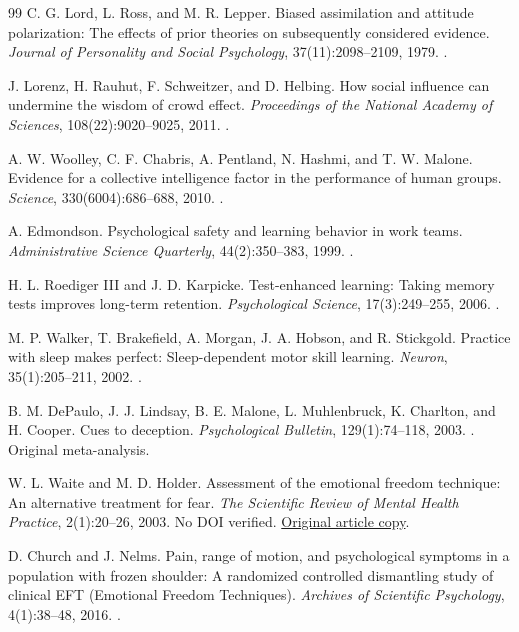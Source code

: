 \begin{thebibliography}{99}
 C. G. Lord, L. Ross, and M. R. Lepper. Biased assimilation and attitude polarization: The effects of prior theories on subsequently considered evidence. \emph{Journal of Personality and Social Psychology}, 37(11):2098--2109, 1979. .

 J. Lorenz, H. Rauhut, F. Schweitzer, and D. Helbing. How social influence can undermine the wisdom of crowd effect. \emph{Proceedings of the National Academy of Sciences}, 108(22):9020--9025, 2011. .

 A. W. Woolley, C. F. Chabris, A. Pentland, N. Hashmi, and T. W. Malone. Evidence for a collective intelligence factor in the performance of human groups. \emph{Science}, 330(6004):686--688, 2010. .

 A. Edmondson. Psychological safety and learning behavior in work teams. \emph{Administrative Science Quarterly}, 44(2):350--383, 1999. .

 H. L. Roediger III and J. D. Karpicke. Test-enhanced learning: Taking memory tests improves long-term retention. \emph{Psychological Science}, 17(3):249--255, 2006. .

 M. P. Walker, T. Brakefield, A. Morgan, J. A. Hobson, and R. Stickgold. Practice with sleep makes perfect: Sleep-dependent motor skill learning. \emph{Neuron}, 35(1):205--211, 2002. .

 B. M. DePaulo, J. J. Lindsay, B. E. Malone, L. Muhlenbruck, K. Charlton, and H. Cooper. Cues to deception. \emph{Psychological Bulletin}, 129(1):74--118, 2003. . Original meta-analysis.

 W. L. Waite and M. D. Holder. Assessment of the emotional freedom technique: An alternative treatment for fear. \emph{The Scientific Review of Mental Health Practice}, 2(1):20--26, 2003. No DOI verified. \href{https://ecole-eft-france.fr/download_data_files/WcLe3CUlCvepQa9fAOiC4w}{Original article copy}.

 D. Church and J. Nelms. Pain, range of motion, and psychological symptoms in a population with frozen shoulder: A randomized controlled dismantling study of clinical EFT (Emotional Freedom Techniques). \emph{Archives of Scientific Psychology}, 4(1):38--48, 2016. .


\end{thebibliography}
